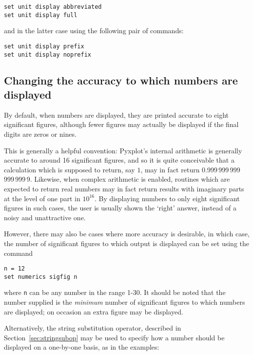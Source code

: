 \begin{verbatim}
set unit display abbreviated
set unit display full
\end{verbatim}

\noindent and in the latter case using the following pair of commands:

\begin{verbatim}
set unit display prefix
set unit display noprefix
\end{verbatim}

\subsection{Changing the accuracy to which numbers are displayed}

By default, when numbers are displayed, they are printed accurate to eight
significant figures, although fewer figures may actually be displayed if the
final digits are zeros or nines.

This is generally a helpful convention: Pyxplot's internal arithmetic is
generally accurate to around 16 significant figures, and so it is quite
conceivable that a calculation which is supposed to return, say $1$, may in
fact return 0.999\,999\,999\,999\,999\,9. Likewise, when complex arithmetic is
enabled, routines which are expected to return real numbers may in fact return
results with imaginary parts at the level of one part in $10^{16}$.  By
displaying numbers to only eight significant figures in such cases, the user is
usually shown the `right' answer, instead of a noisy and unattractive one.

However, there may also be cases where more accuracy is desirable, in which
case, the number of significant figures to which output is displayed can be set
using the command

\begin{verbatim}
n = 12
set numerics sigfig n
\end{verbatim}

\noindent where {\tt n} can be any number in the range 1-30. It should be noted
that the number supplied is the {\it minimum} number of significant figures to
which numbers are displayed; on occasion an extra figure may be displayed.

Alternatively, the string substitution operator, described in
Section~\ref{sec:stringsubop} may be used to specify how a number should be
displayed on a one-by-one basis, as in the examples:

\vspace{3mm}


